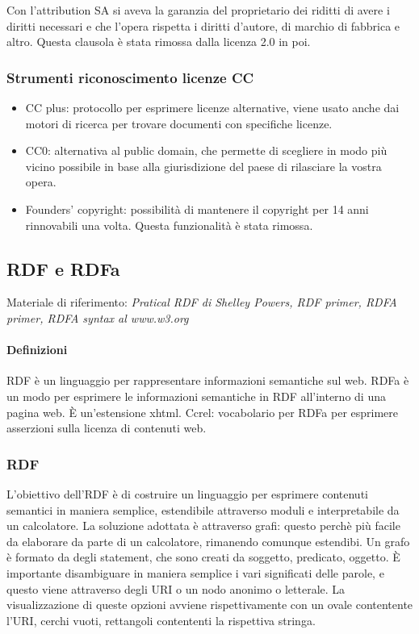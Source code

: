 Con l'attribution SA si aveva la garanzia del proprietario dei riditti di avere i diritti necessari e che l'opera rispetta i diritti d'autore, di marchio di fabbrica e altro. Questa clausola \`e stata rimossa dalla licenza 2.0 in poi.

\subsubsection{Strumenti riconoscimento licenze CC}
\begin{itemize}

\item CC plus: protocollo per esprimere licenze alternative, viene usato anche dai motori di ricerca per trovare documenti con specifiche licenze.
\item CC0: alternativa al public domain, che permette di scegliere in modo pi\`u vicino possibile in base alla giurisdizione del paese di rilasciare la vostra opera.
\item Founders' copyright: possibilit\`a di mantenere il copyright per 14 anni rinnovabili una volta. Questa funzionalit\`a \`e stata rimossa.

\end{itemize}

\subsection{RDF e RDFa}

Materiale di riferimento: \textit{Pratical RDF di Shelley Powers, RDF primer, RDFA primer, RDFA syntax al www.w3.org}

\paragraph*{Definizioni}RDF \`e un linguaggio per rappresentare informazioni semantiche sul web.
RDFa \`e un modo per esprimere le informazioni semantiche in RDF all'interno di una pagina web. \`E un'estensione xhtml.
Ccrel: vocabolario per RDFa per esprimere asserzioni sulla licenza di contenuti web.

\subsubsection{RDF}
L'obiettivo dell'RDF \`e di costruire un linguaggio per esprimere contenuti semantici in maniera semplice, estendibile attraverso moduli e interpretabile da un calcolatore.
La soluzione adottata \`e attraverso grafi: questo perch\`e pi\`u facile da elaborare da parte di un calcolatore, rimanendo comunque estendibi. Un grafo \`e formato da degli statement, che sono creati da soggetto, predicato, oggetto. \`E importante disambiguare in maniera semplice i vari significati delle parole, e questo viene attraverso degli URI o un nodo anonimo o letterale. La visualizzazione di queste opzioni avviene rispettivamente con un ovale contentente l'URI, cerchi vuoti, rettangoli contententi la rispettiva stringa.

